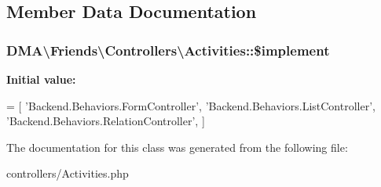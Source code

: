 \subsection{Member Data Documentation}
\hypertarget{classDMA_1_1Friends_1_1Controllers_1_1Activities_aff57941f0ab53e417ce578994badc87f}{
\subsubsection[{\$implement}]{\setlength{\rightskip}{0pt plus 5cm}D\+M\+A\textbackslash{}\+Friends\textbackslash{}\+Controllers\textbackslash{}\+Activities\+::\$implement}}\label{classDMA_1_1Friends_1_1Controllers_1_1Activities_aff57941f0ab53e417ce578994badc87f}
{\bfseries Initial value\+:}
\begin{DoxyCode}
= [
        \textcolor{stringliteral}{'Backend.Behaviors.FormController'},
        \textcolor{stringliteral}{'Backend.Behaviors.ListController'},
        \textcolor{stringliteral}{'Backend.Behaviors.RelationController'},
    ]
\end{DoxyCode}


The documentation for this class was generated from the following file\+:\begin{DoxyCompactItemize}
\item 
controllers/Activities.\+php\end{DoxyCompactItemize}
